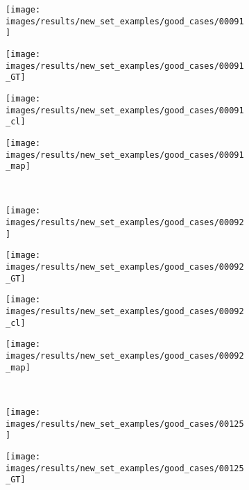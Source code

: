 \begin{figure}[t]
 \centering
 \begin{subfigure}[c]{0.24\textwidth}
  \centering
  \texttt{[image: images/results/new\_set\_examples/good\_cases/00091]}
 \end{subfigure}
 \begin{subfigure}[c]{0.24\textwidth}
  \centering
  \texttt{[image: images/results/new\_set\_examples/good\_cases/00091\_GT]}
 \end{subfigure}
 \begin{subfigure}[c]{0.24\textwidth}
  \centering
  \texttt{[image: images/results/new\_set\_examples/good\_cases/00091\_cl]}
 \end{subfigure}
 \begin{subfigure}[c]{0.24\textwidth}
  \centering
  \texttt{[image: images/results/new\_set\_examples/good\_cases/00091\_map]}
 \end{subfigure}
 \\
 \begin{subfigure}[c]{0.24\textwidth}
  \centering
  \texttt{[image: images/results/new\_set\_examples/good\_cases/00092]}
 \end{subfigure}
 \begin{subfigure}[c]{0.24\textwidth}
  \centering
  \texttt{[image: images/results/new\_set\_examples/good\_cases/00092\_GT]}
 \end{subfigure}
 \begin{subfigure}[c]{0.24\textwidth}
  \centering
  \texttt{[image: images/results/new\_set\_examples/good\_cases/00092\_cl]}
 \end{subfigure}
 \begin{subfigure}[c]{0.24\textwidth}
  \centering
  \texttt{[image: images/results/new\_set\_examples/good\_cases/00092\_map]}
 \end{subfigure}
 \\
 \begin{subfigure}[c]{0.24\textwidth}
  \centering
  \texttt{[image: images/results/new\_set\_examples/good\_cases/00125]}
 \end{subfigure}
 \begin{subfigure}[c]{0.24\textwidth}
  \centering
  \texttt{[image: images/results/new\_set\_examples/good\_cases/00125\_GT]}
 \end{subfigure}
 \begin{subfigure}[c]{0.24\textwidth}

\end{subfigure}
\end{figure}
